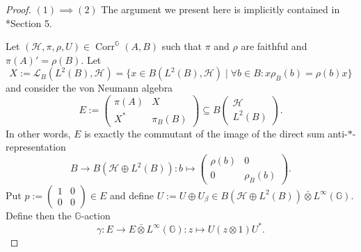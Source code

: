 \documentclass[reqno]{amsart}
\numberwithin{equation}{section}
\newcommand{\G}{\mathbb{G}}
\newcommand{\ovot}{\bar{\otimes}}
\begin{document}
\begin{proof}
    $(1)\implies (2)$ The argument we present here is implicitly contained in \cite{DCDR24a}*{Section 5}.
    
    Let $(\mathcal{H}, \pi, \rho, U)\in \operatorname{Corr}^\G(A,B)$ such that $\pi$ and $\rho$ are faithful and $\pi(A)'= \rho(B)$. Let
    $$X:= \mathscr{L}_B(L^2(B), \mathcal{H})= \{x\in B(L^2(B), \mathcal{H})\mid\forall b \in B: x\rho_B(b) = \rho(b)x\}$$
    and consider the von Neumann algebra 
    $$E:= \begin{pmatrix}\pi(A) & X \\ X^* &\pi_B(B)\end{pmatrix}\subseteq B\begin{pmatrix}
        \mathcal{H}\\ L^2(B)
    \end{pmatrix}.$$
    In other words, $E$ is exactly the commutant of the image of the direct sum anti-$*$-representation
    $$B \to B(\mathcal{H}\oplus L^2(B)): b \mapsto \begin{pmatrix} \rho(b) & 0 \\ 0 & \rho_B(b)
    \end{pmatrix}.$$
    Put $p:= \begin{pmatrix}1 & 0 \\ 0 & 0\end{pmatrix}\in E$ and define $U:= U\oplus U_\beta \in B(\mathcal{H}\oplus L^2(B))\ovot L^\infty(\G)$. Define then the $\G$-action
    $$\gamma: E\to E \ovot L^\infty(\G): z \mapsto U(z\otimes 1)U^*.$$ 


\end{proof}
\end{document}
